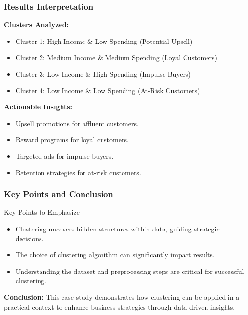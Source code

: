 \documentclass[aspectratio=169]{beamer}
\begin{document}
\begin{frame}[fragile]
  \frametitle{Results Interpretation}
  
  \textbf{Clusters Analyzed:}
  \begin{itemize}
    \item Cluster 1: High Income \& Low Spending (Potential Upsell)
    \item Cluster 2: Medium Income \& Medium Spending (Loyal Customers)
    \item Cluster 3: Low Income \& High Spending (Impulse Buyers)
    \item Cluster 4: Low Income \& Low Spending (At-Risk Customers)
  \end{itemize}
  
  \textbf{Actionable Insights:}
  \begin{itemize}
    \item Upsell promotions for affluent customers.
    \item Reward programs for loyal customers.
    \item Targeted ads for impulse buyers.
    \item Retention strategies for at-risk customers.
  \end{itemize}
\end{frame}

\begin{frame}
  \frametitle{Key Points and Conclusion}

  \begin{block}{Key Points to Emphasize}
    \begin{itemize}
      \item Clustering uncovers hidden structures within data, guiding strategic decisions.
      \item The choice of clustering algorithm can significantly impact results.
      \item Understanding the dataset and preprocessing steps are critical for successful clustering.
    \end{itemize}
  \end{block}

  \textbf{Conclusion:} This case study demonstrates how clustering can be applied in a practical context to enhance business strategies through data-driven insights.
\end{frame}
\end{document}
